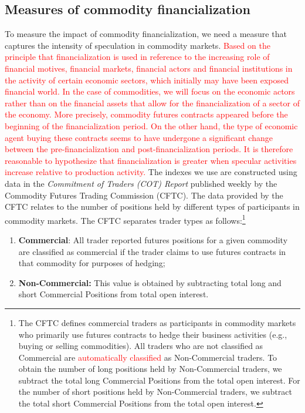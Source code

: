 \documentclass[12pt]{article}
\begin{document}
\subsection{Measures of commodity financialization}
To measure the impact of commodity financialization, we need a measure that captures the intensity of speculation in commodity markets. \textcolor{red}{Based on the principle that financialization is used in reference to the increasing role of financial motives, financial markets, financial actors and financial institutions in the activity of certain economic sectors, which initially may have been exposed financial world. In the case of commodities, we will focus on the economic actors rather than on the financial assets that allow for the financialization of a sector of the economy. More precisely, commodity futures contracts appeared before the beginning of the financialization period. On the other hand, the type of economic agent buying these contracts seems to have undergone a significant change between the pre-financialization and post-financialization periods. It is therefore reasonable to hypothesize that financialization is greater when specular activities increase relative to production activity.}
The indexes we use are constructed using data in the \emph{Commitment of Traders (COT) Report} published weekly by the Commodity Futures Trading Commission (CFTC).  The data provided by the CFTC relates to the number of positions held by different types of participants in commodity markets. The CFTC separates trader types as follows:\footnote{The CFTC defines commercial traders as participants in commodity markets who primarily use futures contracts to hedge their business activities (e.g., buying or selling commodities). All traders who are not classified as Commercial are \textcolor{red}{automatically classified} as Non-Commercial traders. To obtain the number of long positions held by Non-Commercial traders, we subtract the total long Commercial Positions from the total open interest. For the number of short positions held by Non-Commercial traders, we subtract the total short Commercial Positions from the total open interest.}


\begin{enumerate}
\item \textbf{Commercial}: All trader reported futures positions for a given commodity are classified as commercial if the trader claims to use futures contracts in that commodity for purposes of hedging;
\item \textbf{Non-Commercial:} This value is obtained by subtracting total long and short Commercial Positions from  total open interest.
\end{enumerate}
  
\end{document}
